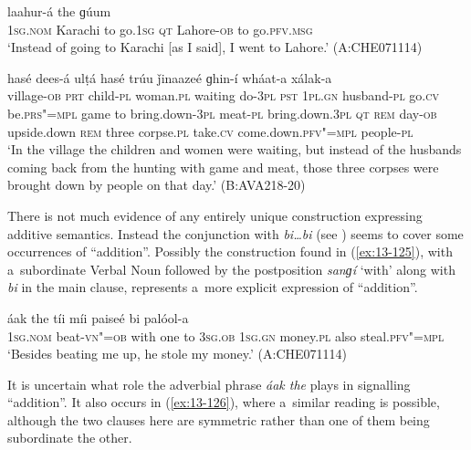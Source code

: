 \begin{exe}
\ex
\label{ex:13-123}
 laahur-á the  ɡúum \\
\textsc{1sg.nom} Karachi to go.\textsc{1sg} \textsc{qt} Lahore-\textsc{ob} to go.\textsc{pfv.msg} \\
\glt `Instead of going to Karachi [as I said], I went to Lahore.' (A:CHE071114)

\ex
\label{ex:13-124}
 hasé	dees-á ulṭá hasé trúu ǰinaazeé ɡhin-í wháat-a xálak-a \\
village-\textsc{ob} \textsc{prt} child-\textsc{pl} woman.\textsc{pl} waiting do-\textsc{3pl}
\textsc{pst} \textsc{1pl.gn} husband-\textsc{pl} go.\textsc{cv} be.\textsc{prs"=mpl} game to
bring.down-\textsc{3pl} meat-\textsc{pl} bring.down.\textsc{3pl} \textsc{qt}  \textsc{rem} day-\textsc{ob} upside.down \textsc{rem} three corpse.\textsc{pl} take.\textsc{cv} come.down.\textsc{pfv"=mpl} people-\textsc{pl} \\
\glt `In the village the children and women were waiting, but instead of the husbands coming back from the hunting with game and meat, those three corpses were brought down by people on that day.' (B:AVA218-20) 
\end{exe}

 There is not much evidence of any entirely unique construction expressing additive semantics. Instead the conjunction with \textit{bi{\ldots}bi} (see ) seems to cover some occurrences of ``addition''. Possibly the construction found in (\ref{ex:13-125}), with a~subordinate Verbal Noun followed by the postposition \textit{sanɡí} `with' along with \textit{bi} in the main clause, represents a~more explicit expression of ``addition''. 

\begin{exe}
\ex
\label{ex:13-125}
 áak the tíi míi  paiseé bi palóol-a \\
\textsc{1sg.nom} beat-\textsc{vn"=ob} with one to \textsc{3sg.ob} \textsc{1sg.gn} money.\textsc{pl}  also steal.\textsc{pfv"=mpl} \\
\glt `Besides beating me up, he stole my money.' (A:CHE071114) 
\end{exe}

It is uncertain what role the adverbial phrase \textit{áak the} plays in signalling ``addition''. It also occurs in (\ref{ex:13-126}), where a~similar reading is possible, although the two clauses here are symmetric rather than one of them being subordinate the other.

